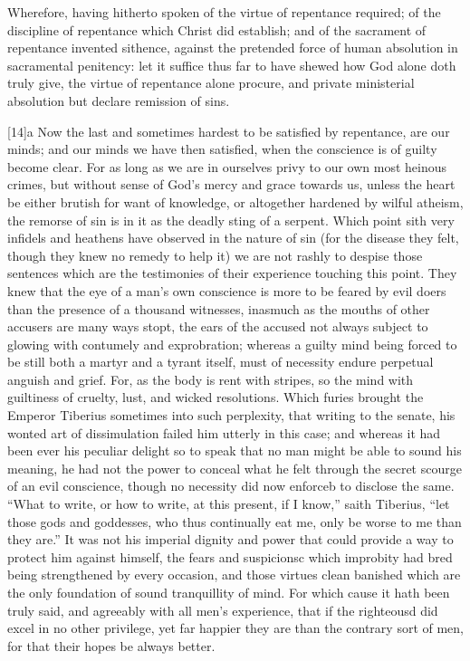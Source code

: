 Wherefore, having hitherto spoken of the virtue of repentance required; of the discipline of repentance which Christ did establish; and of the sacrament of repentance invented sithence, against the pretended force of human absolution in sacramental penitency: let it suffice thus far to have shewed how God alone doth truly give, the virtue of repentance alone procure, and private ministerial absolution but declare remission of sins.

[14]a Now the last and sometimes hardest to be satisfied by repentance, are our minds; and our minds we have then satisfied, when the conscience is of guilty become clear. For as long as we are in ourselves privy to our own most heinous crimes, but without sense of God’s mercy and grace towards us, unless the heart be either brutish for want of knowledge, or altogether hardened by wilful atheism, the remorse of sin is in it as the deadly sting of a serpent. Which point sith very infidels and heathens have observed in the nature of sin (for the disease they felt, though they knew no remedy to help it) we are not rashly to despise those sentences which are the testimonies of their experience touching this point. They knew that the eye of a man’s own conscience is more to be feared by evil doers than the presence of a thousand witnesses, inasmuch as the mouths of other accusers are many ways stopt, the ears of the accused not always subject to glowing with contumely and exprobration; whereas a guilty mind being forced to be still both a martyr and a tyrant itself, must of necessity endure perpetual anguish and grief. For, as the body is rent with stripes, so the mind with guiltiness of cruelty, lust, and wicked resolutions. Which furies brought the Emperor Tiberius sometimes into such perplexity, that writing to the senate, his wonted art of dissimulation failed him utterly in this case; and whereas it had been ever his peculiar delight so to speak that no man might be able to sound his meaning, he had not  the power to conceal what he felt through the secret scourge of an evil conscience, though no necessity did now enforceb to disclose the same. “What to write, or how to write, at this present, if I know,” saith Tiberius, “let those gods and goddesses, who thus continually eat me, only be worse to me than they are.” It was not his imperial dignity and power that could provide a way to protect him against himself, the fears and suspicionsc which improbity had bred being strengthened by every occasion, and those virtues clean banished which are the only foundation of sound tranquillity of mind. For which cause it hath been truly said, and agreeably with all men’s experience, that if the righteousd did excel in no other privilege, yet far happier they are than the contrary sort of men, for that their hopes be always better.

